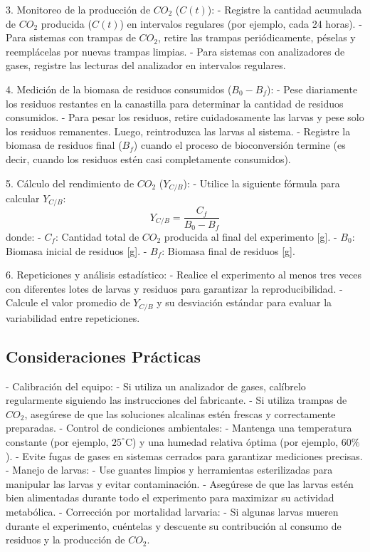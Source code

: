 \documentclass[12pt]{article}
\begin{document}
3. Monitoreo de la producción de $CO_2$ ($C(t)$):
   - Registre la cantidad acumulada de $CO_2$ producida ($C(t)$) en intervalos regulares (por ejemplo, cada 24 horas).
   - Para sistemas con trampas de $CO_2$, retire las trampas periódicamente, péselas y reemplácelas por nuevas trampas limpias.
   - Para sistemas con analizadores de gases, registre las lecturas del analizador en intervalos regulares.

4. Medición de la biomasa de residuos consumidos ($B_0 - B_f$):
   - Pese diariamente los residuos restantes en la canastilla para determinar la cantidad de residuos consumidos.
   - Para pesar los residuos, retire cuidadosamente las larvas y pese solo los residuos remanentes. Luego, reintroduzca las larvas al sistema.
   - Registre la biomasa de residuos final ($B_f$) cuando el proceso de bioconversión termine (es decir, cuando los residuos estén casi completamente consumidos).

5. Cálculo del rendimiento de $CO_2$ ($Y_{C/B}$):
   - Utilice la siguiente fórmula para calcular $Y_{C/B}$:
     \[
     Y_{C/B} = \frac{C_f}{B_0 - B_f}
     \]
     donde:
     - $C_f$: Cantidad total de $CO_2$ producida al final del experimento [g].
     - $B_0$: Biomasa inicial de residuos [g].
     - $B_f$: Biomasa final de residuos [g].

6. Repeticiones y análisis estadístico:
   - Realice el experimento al menos tres veces con diferentes lotes de larvas y residuos para garantizar la reproducibilidad.
   - Calcule el valor promedio de $Y_{C/B}$ y su desviación estándar para evaluar la variabilidad entre repeticiones.

\subsection{Consideraciones Prácticas}

- Calibración del equipo:
  - Si utiliza un analizador de gases, calíbrelo regularmente siguiendo las instrucciones del fabricante.
  - Si utiliza trampas de $CO_2$, asegúrese de que las soluciones alcalinas estén frescas y correctamente preparadas.
- Control de condiciones ambientales:
  - Mantenga una temperatura constante (por ejemplo, $25^\circ \text{C}$) y una humedad relativa óptima (por ejemplo, $60\%$).
  - Evite fugas de gases en sistemas cerrados para garantizar mediciones precisas.
- Manejo de larvas:
  - Use guantes limpios y herramientas esterilizadas para manipular las larvas y evitar contaminación.
  - Asegúrese de que las larvas estén bien alimentadas durante todo el experimento para maximizar su actividad metabólica.
- Corrección por mortalidad larvaria:
  - Si algunas larvas mueren durante el experimento, cuéntelas y descuente su contribución al consumo de residuos y la producción de $CO_2$.
\end{document}
